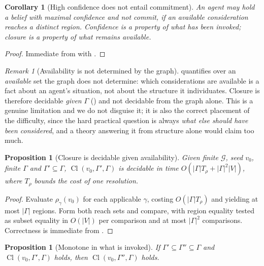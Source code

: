 \documentclass[11pt,a4paper]{article}
\theoremstyle{clstyle}
\newtheorem{proposition}[theorem]{Proposition}
\newtheorem{corollary}[theorem]{Corollary}
\theoremstyle{definition}
\theoremstyle{remark}
\newtheorem{remark}[theorem]{Remark}
\DeclareMathOperator{\Cl}{Cl}
\newcommand{\Gph}{\mathcal{G}}
\newcommand{\V}{V}
\newcommand{\abs}[1]{\lvert#1\rvert}
\begin{document}
\begin{corollary}[High confidence does not entail commitment]
\label{cor:conf}
An agent may hold a belief with maximal confidence and not commit, if an
available consideration reaches a distinct region. Confidence is a property
of what has been invoked; closure is a property of what remains available.
\end{corollary}

\begin{proof}
Immediate from  with .
\end{proof}

\begin{remark}[Availability is not determined by the graph]
\label{rem:availability}
 quantifies over an \emph{available} set the graph does not
determine: which considerations are available is a fact about an agent's
situation, not about the structure it individuates. Closure is therefore
decidable \emph{given} $\Gamma$ () and not decidable
from the graph alone. This is a genuine limitation and we do not disguise
it; it is also the correct placement of the difficulty, since the hard
practical question is always \emph{what else should have been considered},
and a theory answering it from structure alone would claim too much.
\end{remark}

\begin{proposition}[Closure is decidable given availability]
\label{prop:decidable}
Given finite $\Gph$, seed $v_0$, finite $\Gamma$ and $\Gamma'\subseteq\Gamma$,
$\Cl(v_0,\Gamma',\Gamma)$ is decidable in time
$O(\abs{\Gamma}T_\rho+\abs{\Gamma}^2\abs{\V})$, where $T_\rho$ bounds the
cost of one resolution.
\end{proposition}

\begin{proof}
Evaluate $\rho_\gamma(v_0)$ for each applicable $\gamma$, costing
$O(\abs{\Gamma}T_\rho)$ and yielding at most $\abs{\Gamma}$ regions. Form
both reach sets and compare, with region equality tested as subset equality
in $O(\abs{\V})$ per comparison and at most $\abs{\Gamma}^2$ comparisons.
Correctness is immediate from .
\end{proof}

\begin{proposition}[Monotone in what is invoked]
\label{prop:mono-invoked}
If $\Gamma'\subseteq\Gamma''\subseteq\Gamma$ and $\Cl(v_0,\Gamma',\Gamma)$
holds, then $\Cl(v_0,\Gamma'',\Gamma)$ holds.
\end{proposition}
\end{document}
